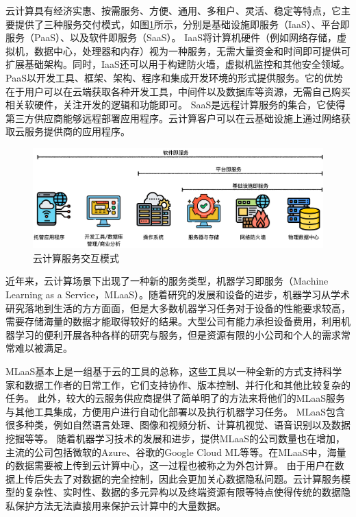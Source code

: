 云计算具有经济实惠、按需服务、方便、通用、多租户、灵活、稳定等特点，它主要提供了三种服务交付模式，如图\ref{img_saas}所示，分别是基础设施即服务（IaaS）、平台即服务（PaaS）、以及软件即服务（SaaS）。
IaaS将计算机硬件（例如网络存储，虚拟机，数据中心，处理器和内存）视为一种服务，无需大量资金和时间即可提供可扩展基础架构。同时，IaaS还可以用于构建防火墙，虚拟机监控和其他安全领域\cite{manvi2014resource}。
PaaS以开发工具、框架、架构、程序和集成开发环境的形式提供服务。它的优势在于用户可以在云端获取各种开发工具，中间件以及数据库等资源，无需自己购买相关软硬件，关注开发的逻辑和功能即可。
SaaS是远程计算服务的集合，它使得第三方供应商能够远程部署应用程序。云计算客户可以在云基础设施上通过网络获取云服务提供商的应用程序\cite{antonopoulos2010cloud}。

\begin{figure}[htbp]
	\centering
	\includegraphics[width=1.0\linewidth]{img/cloudservice.png}
	\caption{云计算服务交互模式}
	\label{img_saas}
\end{figure}

近年来，云计算场景下出现了一种新的服务类型，机器学习即服务（Machine Learning as a Service，MLaaS）\cite{ribeiro2015mlaas}。随着研究的发展和设备的进步，机器学习从学术研究落地到生活的方方面面，但是大多数机器学习任务对于设备的性能要求较高，需要存储海量的数据才能取得较好的结果。大型公司有能力承担设备费用，利用机器学习的便利开展各种各样的研究与服务，但是资源有限的小公司和个人的需求常常难以被满足。

MLaaS基本上是一组基于云的工具的总称，这些工具以一种全新的方式支持科学家和数据工作者的日常工作，它们支持协作、版本控制、并行化和其他比较复杂的任务。
此外，较大的云服务供应商提供了简单明了的方法来将他们的MLaaS服务与其他工具集成，方便用户进行自动化部署以及执行机器学习任务。
MLaaS包含很多种类，例如自然语言处理、图像和视频分析、计算机视觉、语音识别以及数据挖掘等等。
随着机器学习技术的发展和进步，提供MLaaS的公司数量也在增加，主流的公司包括微软的Azure、谷歌的Google Cloud ML等等。在MLaaS中，海量的数据需要被上传到云计算中心，这一过程也被称之为外包计算。
由于用户在数据上传后失去了对数据的完全控制，因此会更加关心数据隐私问题。云计算服务模型的复杂性、实时性、数据的多元异构以及终端资源有限等特点使得传统的数据隐私保护方法无法直接用来保护云计算中的大量数据\cite{hunt2018chiron}。

